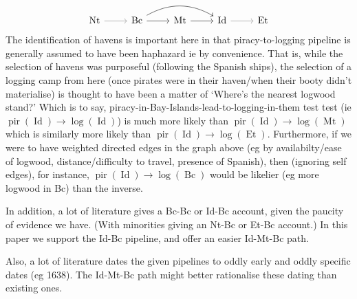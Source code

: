 \documentclass{amsart}
\DeclareMathOperator{\pir}{pir}%
\DeclareMathOperator{\id}{Id}%
\DeclareMathOperator{\mt}{Mt}%
\DeclareMathOperator{\bc}{Bc}%
\DeclareMathOperator{\et}{Et}%
\DeclareMathOperator{\nt}{Nt}%
\theoremstyle{definition}%
\theoremstyle{definition}%
\theoremstyle{remark}%
\begin{document}
%
\begin{equation}
\label{graph:prop}%
\begin{tikzcd}
\nt \rar[color=gray] &\bc \rar \ar[rr,bend left] &\mt \rar &\id \rar[color=gray] &\et
\end{tikzcd}
\end{equation}
%
The identification of havens is important here in that piracy-to-logging pipeline is generally assumed to have been haphazard ie by convenience. That is, while the selection of havens was purposeful (following the Spanish ships), the selection of a logging camp from here (once pirates were in their haven/when their booty didn't materialise) is thought to have been a matter of `Where's the nearest logwood stand?' %
Which is to say, piracy-in-Bay-Islands-lead-to-logging-in-them test test (ie \(\pir(\id)\to\log(\id)\)) is much more likely than \(\pir(\id)\to\log(\mt)\) which is similarly more likely than \(\pir(\id)\to\log(\et)\). Furthermore, if we were to have weighted directed edges in the graph above (eg by availabilty/ease of logwood, distance/difficulty to travel, presence of Spanish), then (ignoring self edges), for instance, \(\pir(\id)\to\log(\bc)\) would be likelier (eg more logwood in Bc) than the inverse.

In addition, a lot of literature gives a Bc-Bc or Id-Bc account, given the paucity of evidence we have. (With minorities giving an Nt-Bc or Et-Bc account.) In this paper we support the Id-Bc pipeline, and offer an easier Id-Mt-Bc path.

Also, a lot of literature dates the given pipelines to oddly early and oddly specific dates (eg 1638). The Id-Mt-Bc path might better rationalise these dating than existing ones.
%
%
%
%
\end{document}
